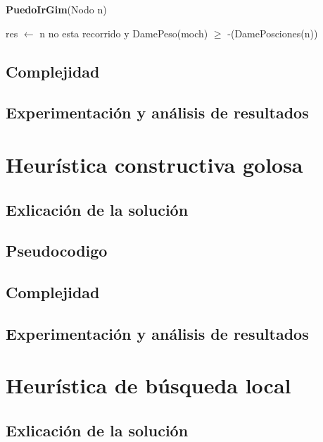 \documentclass[spanish,12pt]{article}
\begin{document}
\begin{algorithm}[H]{\textbf{PuedoIrGim}(Nodo n)}
	\begin{algorithmic}[1]
		\state res $\gets$  n no esta recorrido y DamePeso(moch) $\geq$ -(DamePosciones(n))
	\end{algorithmic}
\end{algorithm}


\subsection{Complejidad}

\subsection{Experimentación y análisis de resultados}



\section{Heurística constructiva golosa}

\subsection{Exlicación de la solución}

\subsection{Pseudocodigo}

\subsection{Complejidad}

\subsection{Experimentación y análisis de resultados}




\section{Heurística de búsqueda local}

\subsection{Exlicación de la solución}
\end{document}
